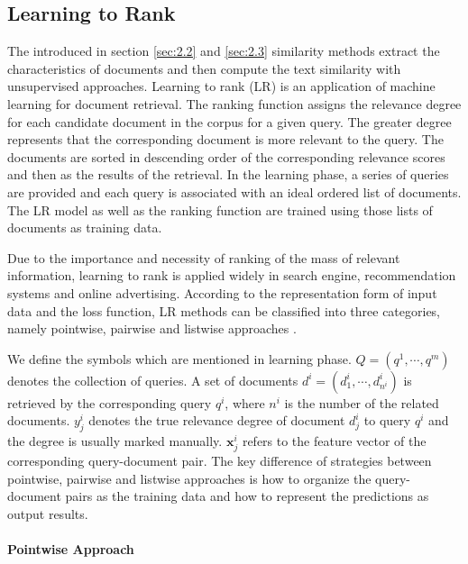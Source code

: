 \bigbreak

\subsection{Learning to Rank}
\label{sec:2.4}

The introduced in section \ref{sec:2.2} and \ref{sec:2.3} similarity methods extract the characteristics of documents and then compute the text similarity with unsupervised approaches. Learning to rank (LR) is an application of machine learning for document retrieval. The ranking function assigns the relevance degree for each candidate document in the corpus for a given query. The greater degree represents that the corresponding document is more relevant to the query. The documents are sorted in descending order of the corresponding relevance scores and then as the results of the retrieval. In the learning phase, a series of queries are provided and each query is associated with an ideal ordered list of documents. The LR model as well as the ranking function are trained using those lists of documents as training data. 

Due to the importance and necessity of ranking of the mass of relevant information, learning to rank is applied widely in search engine, recommendation systems and online advertising. According to the representation form of input data and the loss function, LR methods can be classified into three categories, namely pointwise, pairwise and listwise approaches \citet{liu2009learning}. 

We define the symbols which are mentioned in learning phase. $Q=(q^1,\cdots,q^m)$ denotes the collection of queries. A set of documents $d^i=(d_1^i, \cdots, d_{n^i}^i)$ is retrieved by the corresponding query $q^i$, where $n^i$ is the number of the related documents. $y_j^i$ denotes the true relevance degree of document $d_j^i$ to query $q^i$ and the degree is usually marked manually. $\mathbf{x}_j^i$ refers to the feature vector of the corresponding query-document pair. The key difference of strategies between pointwise, pairwise and listwise approaches is how to organize the query-document pairs as the training data and how to represent the predictions as output results. 

\paragraph{Pointwise Approach}

